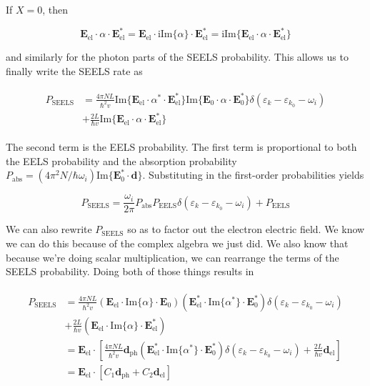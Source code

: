 \documentclass [11pt, proquest] {uwthesis}[2016/11/22]
\begin{document}
If $X = 0$, then 

\begin{equation}
\textbf{E}_{\textrm{el}}\cdot\alpha\cdot\textbf{E}_{\textrm{el}}^* = \textbf{E}_{\textrm{el}}\cdot\textrm{i}\textrm{Im}\{\alpha\}\cdot\textbf{E}_{\textrm{el}}^* = \textrm{i}\textrm{Im}\{\textbf{E}_{\textrm{el}}\cdot\alpha\cdot\textbf{E}_{\textrm{el}}^*\}
\end{equation}

and similarly for the photon parts of the SEELS probability. This allows us to finally write the SEELS rate as

\begin{align}
\begin{split}
  P_{\textrm{SEELS}} &= \frac{4\pi NL}{\hbar^2v}\textrm{Im}\{\textbf{E}_{\textrm{el}}\cdot\alpha^*\cdot\textbf{E}_{\textrm{el}}^*\}\textrm{Im}\{\textbf{E}_0\cdot\alpha\cdot\textbf{E}_0^*\}\delta(\varepsilon_k - \varepsilon_{k_0}-\omega_i)\\
  &+ \frac{2L}{\hbar v}\textrm{Im}\{\textbf{E}_{\textrm{el}}\cdot\alpha\cdot\textbf{E}_{\textrm{el}}^*\}
  \end{split}
\end{align}

The second term is the EELS probability. The first term is proportional to both the EELS probability and the absorption probability $P_{\textrm{abs}} = (4\pi^2N/\hbar\omega_i)\textrm{Im}\{\textbf{E}_0^*\cdot\textbf{d}\}$. Substituting in the first-order probabilities yields

\begin{equation}
P_{\textrm{SEELS}} = \frac{\omega_i}{2\pi}P_{\textrm{abs}}P_{\textrm{EELS}}\delta(\varepsilon_k-\varepsilon_{k_0}-\omega_i) + P_{\textrm{EELS}}
\end{equation}

We can also rewrite $P_{\textrm{SEELS}}$ so as to factor out the electron electric field. We know we can do this because of the complex algebra we just did. We also know that because we're doing scalar multiplication, we can rearrange the terms of the SEELS probability. Doing both of those things results in

\begin{align}
\begin{split}
  P_{\textrm{SEELS}} &= \frac{4\pi NL}{\hbar^2v}(\textbf{E}_{\textrm{el}}\cdot\textrm{Im}\{\alpha\}\cdot\textbf{E}_0)(\textbf{E}_{\textrm{el}}^*\cdot\textrm{Im}\{\alpha^*\}\cdot\textbf{E}_0^*)\delta(\varepsilon_k - \varepsilon_{k_0}-\omega_i)\\
  &+ \frac{2L}{\hbar v}(\textbf{E}_{\textrm{el}}\cdot\textrm{Im}\{\alpha\}\cdot\textbf{E}_{\textrm{el}}^*)\\
  &= \textbf{E}_{\textrm{el}}\cdot\left[ \frac{4\pi NL}{\hbar^2v}\textbf{d}_{\textrm{ph}}(\textbf{E}_{\textrm{el}}^*\cdot\textrm{Im}\{\alpha^*\}\cdot\textbf{E}_0^*)\delta(\varepsilon_k - \varepsilon_{k_0}-\omega_i) + \frac{2L}{\hbar v}\textbf{d}_{\textrm{el}} \right]\\
  &= \textbf{E}_{\textrm{el}}\cdot\left[ C_1\textbf{d}_{\textrm{ph}} + C_2\textbf{d}_{\textrm{el}} \right] 
  \end{split}
\end{align}
\end{document}
